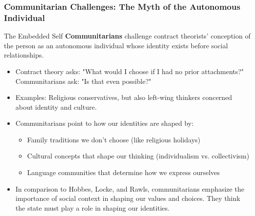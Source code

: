 \documentclass[aspectratio=169]{beamer}
\begin{document}
\begin{frame}
  \frametitle{Communitarian Challenges: The Myth of the Autonomous Individual}
  
  \begin{alertblock}{The Embedded Self}
    \textbf{Communitarians} challenge contract theorists' conception of the person as an autonomous individual whose identity exists before social relationships. 
  \end{alertblock}
  
  \begin{itemize}
    \item Contract theory asks: "What would I choose if I had no prior attachments?" Communitarians ask: "Is that even possible?"
    \item Examples: Religious conservatives,  but also left-wing thinkers concerned about identity and culture.
    \item Communitarians point to how our identities are shaped by:
      \begin{itemize}
        \item Family traditions we don't choose (like religious holidays)
        \item Cultural concepts that shape our thinking (individualism vs. collectivism)
        \item Language communities that determine how we express ourselves
      \end{itemize}
    \item In comparison to Hobbes, Locke, and Rawls, communitarians emphasize the importance of social context in shaping our values and choices. They think the state must play a role in shaping our identities.
  \end{itemize}
\end{frame}
\end{document}
